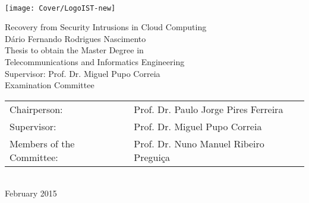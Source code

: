 \setcounter{page}{1} 


\thispagestyle{empty}
\begin{flushleft} ~\\ \vspace{-10mm} \hspace{-9mm}  \texttt{[image: Cover/LogoIST-new]} 
\\ \vspace{80mm}
\begin{centering}
{\FontLb Recovery from Security Intrusions in Cloud Computing} \\
\vspace{2.8cm}
{\FontMb Dário Fernando Rodrigues Nascimento} \\
\vspace{2cm}
{\FontSn Thesis to obtain the Master Degree in} \\
\vspace{0.3cm}
{\FontLb Telecommunications and Informatics Engineering}\\ 
\vspace{1.1cm}
{\FontSn Supervisor: Prof. Dr. Miguel Pupo Correia}\\
\vspace{1.1cm}
{\FontMb Examination Committee} \\
\vspace{0.3cm}
{\FontSn %
\renewcommand{\arraystretch}{1.5} %
\begin{tabular}{ll}
Chairperson: & Prof.  Dr. Paulo Jorge Pires Ferreira \\ 
Supervisor: & Prof. Dr. Miguel Pupo Correia \\ 
Members of the Committee: & Prof. Dr. Nuno Manuel Ribeiro Preguiça
\end{tabular}}\\
\vspace{15mm}
{\FontMb February 2015} \\
\end{centering}
\let\thepage\relax
\end{flushleft}
\pagebreak


\clearpage

\thispagestyle{empty}
\cleardoublepage

\setcounter{page}{1} 

\baselineskip 18pt 